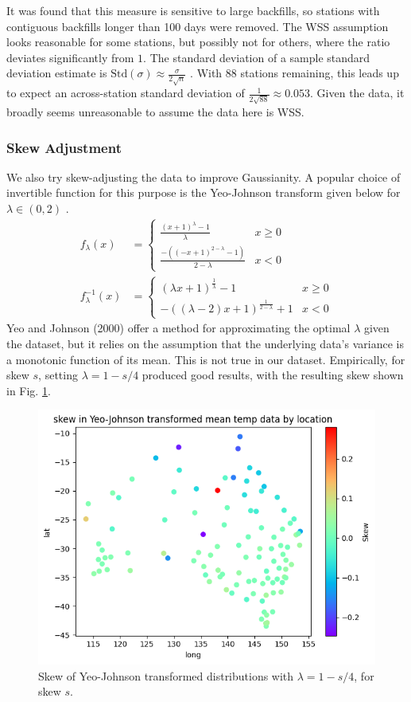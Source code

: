 \documentclass[12pt,a4paper]{article} %
\begin{document}
It was found that this measure is sensitive to large backfills, so stations with contiguous backfills longer than 100 days were removed. The WSS assumption looks reasonable for some stations, but possibly not for others, where the ratio deviates significantly from $1$. The standard deviation of a sample standard deviation estimate is $\text{Std}(\sigma)\approx\frac{\sigma}{2\sqrt{n}}$ \cite{stack}. With 88 stations remaining, this leads up to expect an across-station standard deviation of $\frac{1}{2\sqrt{88}}\approx0.053$. Given the data, it broadly seems unreasonable to assume the data here is WSS.\\

\subsubsection{Skew Adjustment}

We also try skew-adjusting the data to improve Gaussianity. A popular choice of invertible function for this purpose is the Yeo-Johnson transform given below for $\lambda\in(0,2)$ \cite{yeo}.
\begin{align*}
    f_\lambda(x)&=\begin{cases}
        \frac{(x+1)^\lambda-1}{\lambda} & x\geq0\\
        \frac{-((-x+1)^{2-\lambda}-1)}{2-\lambda} & x<0
    \end{cases}\\
    f^{-1}_\lambda(x)&=\begin{cases}
        (\lambda x+1)^{\frac1\lambda}-1&x\geq0\\
        -((\lambda-2)x+1)^\frac1{2-\lambda}+1&x<0
    \end{cases}
\end{align*}
Yeo and Johnson (2000) offer a method for approximating the optimal $\lambda$ given the dataset, but it relies on the assumption that the underlying data's variance is a monotonic function of its mean. This is not true in our dataset. Empirically, for skew $s$, setting $\lambda=1-s/4$ produced good results, with the resulting skew shown in Fig. \ref{fig:yj_skew}.\\

\begin{figure}[!ht]
    \centering
    \includegraphics[width=.7\linewidth]{mean_YJ_dists_by_loc.png}
    \caption{Skew of Yeo-Johnson transformed distributions with $\lambda=1-s/4$, for skew $s$.}
    \label{fig:yj_skew}
\end{figure}
\end{document}
